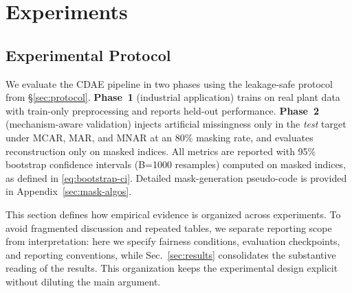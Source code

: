 \section{Experiments}\label{sec:experiments}


\subsection{Experimental Protocol}\label{sec:protocol_exp}
We evaluate the CDAE pipeline in two phases using the leakage-safe protocol from \S\ref{sec:protocol}. \textbf{Phase~1} (industrial application) trains on real plant data with train-only preprocessing and reports held-out performance. \textbf{Phase~2} (mechanism-aware validation) injects artificial missingness only in the \emph{test} target under MCAR, MAR, and MNAR at an 80\% masking rate, and evaluates reconstruction only on masked indices. All metrics are reported with 95\% bootstrap confidence intervals (B=1000 resamples) computed on masked indices, as defined in \eqref{eq:bootstrap-ci}. Detailed mask-generation pseudo-code is provided in Appendix~\ref{sec:mask-algos}.

This section defines how empirical evidence is organized across experiments. To avoid fragmented discussion and repeated tables, we separate reporting scope from interpretation: here we specify fairness conditions, evaluation checkpoints, and reporting conventions, while Sec.~\ref{sec:results} consolidates the substantive reading of the results. This organization keeps the experimental design explicit without diluting the main argument.

